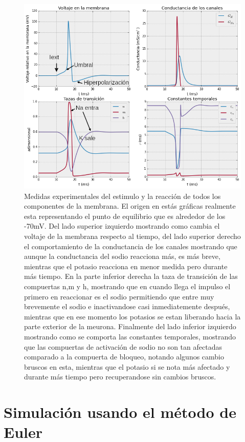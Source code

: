 \begin{figure}[H]
 \includegraphics[scale=0.6]{../Figuras/disparo.png}
 \caption{Medidas experimentales del estimulo y la reacción de todos los componentes de la membrana. El origen en estás gráficas realmente esta representando el punto de equilibrio que es alrededor de los -70mV. Del lado superior izquierdo mostrando como cambia el voltaje de la membrana respecto al tiempo, del lado superior derecho el comportamiento de la conductancia de los canales mostrando que aunque la conductancia del sodio reacciona más, es más breve, mientras que el potasio reacciona en menor medida pero durante más tiempo. En la parte inferior derecha la taza de transición de las compuertas n,m y h, mostrando que en cuando llega el impulso el primero en reaccionar es el sodio permitiendo que entre muy brevemente el sodio e inactivandose casi inmediatemente después, mientras que en ese momento los potasios se estan liberando hacia la parte exterior de la meurona. Finalmente del lado inferior izquierdo mostrando como se comporta las constantes temporales, mostrando que las compuertas de activación de sodio no son tan afectadas comparado a la compuerta de bloqueo, notando algunos cambio bruscos en esta, mientras que el potasio si se nota más afectado y durante más tiempo pero recuperandose sin cambios bruscos. }
 \label{fig:voltajeActInac1}
\end{figure}



\section{Simulación usando el método de Euler}

